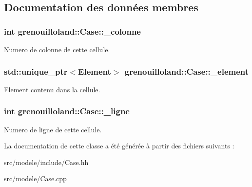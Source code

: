 \subsection{Documentation des données membres}
\hypertarget{classgrenouilloland_1_1Case_a44c61a8ab51a6fedb92c9a92c7eeb9eb}{
\subsubsection[{\-\_\-colonne}]{\setlength{\rightskip}{0pt plus 5cm}int grenouilloland\-::\-Case\-::\-\_\-colonne\hspace{0.3cm}{\ttfamily [protected]}}}\label{classgrenouilloland_1_1Case_a44c61a8ab51a6fedb92c9a92c7eeb9eb}
Numero de colonne de cette cellule. \hypertarget{classgrenouilloland_1_1Case_a3ffd88341a2aee34d145ddf5a986ab37}{
\subsubsection[{\-\_\-element}]{\setlength{\rightskip}{0pt plus 5cm}std\-::unique\-\_\-ptr$<${\bf Element}$>$ grenouilloland\-::\-Case\-::\-\_\-element\hspace{0.3cm}{\ttfamily [protected]}}}\label{classgrenouilloland_1_1Case_a3ffd88341a2aee34d145ddf5a986ab37}
\hyperlink{classgrenouilloland_1_1Element}{Element} contenu dans la cellule. \hypertarget{classgrenouilloland_1_1Case_a852142435ab4a556c148274cccbcfebc}{
\subsubsection[{\-\_\-ligne}]{\setlength{\rightskip}{0pt plus 5cm}int grenouilloland\-::\-Case\-::\-\_\-ligne\hspace{0.3cm}{\ttfamily [protected]}}}\label{classgrenouilloland_1_1Case_a852142435ab4a556c148274cccbcfebc}
Numero de ligne de cette cellule. 

La documentation de cette classe a été générée à partir des fichiers suivants \-:\begin{DoxyCompactItemize}
\item 
src/modele/include/Case.\-hh\item 
src/modele/Case.\-cpp\end{DoxyCompactItemize}
